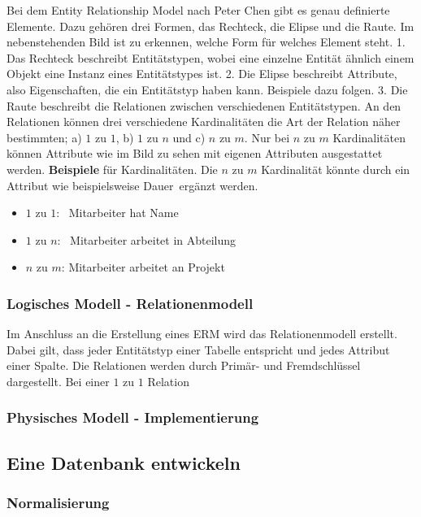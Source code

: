 Bei dem Entity Relationship Model nach Peter Chen gibt es genau definierte Elemente. Dazu gehören drei Formen, das Rechteck, die Elipse und die Raute. Im nebenstehenden Bild ist zu erkennen, welche Form für welches Element steht. 1. Das Rechteck beschreibt Entitätstypen, wobei eine einzelne Entität ähnlich einem Objekt eine Instanz eines Entitätstypes ist. 2. Die Elipse beschreibt Attribute, also Eigenschaften, die ein Entitätstyp haben kann. Beispiele dazu folgen. 3. Die Raute beschreibt die Relationen zwischen verschiedenen Entitätstypen. An den Relationen können drei verschiedene Kardinalitäten die Art der Relation näher bestimmten; a) $1$ zu $1$, b) $1$ zu $n$ und c) $n$ zu $m$. Nur bei $n$ zu $m$ Kardinalitäten können Attribute wie im Bild zu sehen mit eigenen Attributen ausgestattet werden. {\bf Beispiele} für Kardinalitäten. Die $n$ zu $m$ Kardinalität könnte durch ein Attribut wie beispielsweise \ql Dauer\qr\ ergänzt werden.
\begin{itemize}
	\itemsep0em
	\item $1$ zu $1$: \ {\sc Mitarbeiter} hat {\sc Name}
	\item $1$ zu $n$: \ {\sc Mitarbeiter} arbeitet in {\sc Abteilung}
	\item $n$ zu $m$: {\sc Mitarbeiter} arbeitet an {\sc Projekt}
\end{itemize}

\subsubsection{Logisches Modell - Relationenmodell}

Im Anschluss an die Erstellung eines ERM wird das Relationenmodell erstellt. Dabei gilt, dass jeder Entitätstyp einer Tabelle entspricht und jedes Attribut einer Spalte. Die Relationen werden durch Primär- und Fremdschlüssel dargestellt. Bei einer $1$ zu $1$ Relation 

\subsubsection{Physisches Modell - Implementierung}


\subsection{Eine Datenbank entwickeln}
\subsubsection{Normalisierung}

